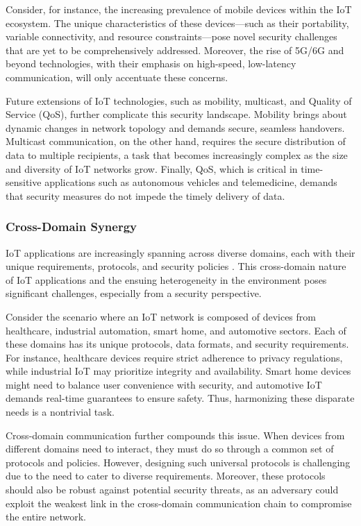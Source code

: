 \documentclass{ieeeaccess}
\begin{document}
Consider, for instance, the increasing prevalence of mobile devices within the IoT ecosystem. The unique characteristics of these devices—such as their portability, variable connectivity, and resource constraints—pose novel security challenges that are yet to be comprehensively addressed. Moreover, the rise of 5G/6G and beyond technologies, with their emphasis on high-speed, low-latency communication, will only accentuate these concerns.

Future extensions of IoT technologies, such as mobility, multicast, and Quality of Service (QoS), further complicate this security landscape. Mobility brings about dynamic changes in network topology and demands secure, seamless handovers. Multicast communication, on the other hand, requires the secure distribution of data to multiple recipients, a task that becomes increasingly complex as the size and diversity of IoT networks grow. Finally, QoS, which is critical in time-sensitive applications such as autonomous vehicles and telemedicine, demands that security measures do not impede the timely delivery of data.

\subsubsection{Cross-Domain Synergy}
IoT applications are increasingly spanning across diverse domains, each with their unique requirements, protocols, and security policies \cite{marinakis2018advanced}. This cross-domain nature of IoT applications and the ensuing heterogeneity in the environment poses significant challenges, especially from a security perspective.

Consider the scenario where an IoT network is composed of devices from healthcare, industrial automation, smart home, and automotive sectors. Each of these domains has its unique protocols, data formats, and security requirements. For instance, healthcare devices require strict adherence to privacy regulations, while industrial IoT may prioritize integrity and availability. Smart home devices might need to balance user convenience with security, and automotive IoT demands real-time guarantees to ensure safety. Thus, harmonizing these disparate needs is a nontrivial task.

Cross-domain communication further compounds this issue. When devices from different domains need to interact, they must do so through a common set of protocols and policies. However, designing such universal protocols is challenging due to the need to cater to diverse requirements. Moreover, these protocols should also be robust against potential security threats, as an adversary could exploit the weakest link in the cross-domain communication chain to compromise the entire network.
\end{document}
